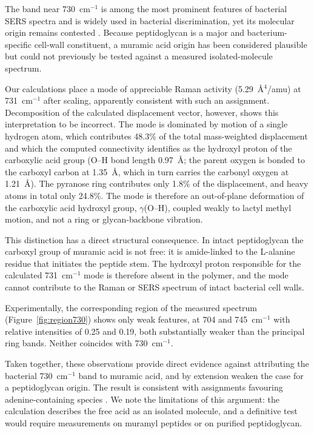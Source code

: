 \documentclass[preprint,12pt]{elsarticle}
\newcommand{\wn}{\ensuremath{\mathrm{cm}^{-1}}}
\begin{document}
The band near 730~\wn{} is among the most prominent features of bacterial
SERS spectra and is widely used in bacterial discrimination, yet its
molecular origin remains contested
\cite{premasiri2016origins,kubryk2016origin}. Because peptidoglycan is a
major and bacterium-specific cell-wall constituent, a muramic acid origin has
been considered plausible but could not previously be tested against a
measured isolated-molecule spectrum.

Our calculations place a mode of appreciable Raman activity
(5.29~\AA$^4$/amu) at 731~\wn{} after scaling, apparently consistent with
such an assignment. Decomposition of the calculated displacement vector,
however, shows this interpretation to be incorrect. The mode is dominated by
motion of a single hydrogen atom, which contributes 48.3\% of the total
mass-weighted displacement and which the computed connectivity identifies as
the hydroxyl proton of the carboxylic acid group (O--H bond length 0.97~\AA;
the parent oxygen is bonded to the carboxyl carbon at 1.35~\AA, which in turn
carries the carbonyl oxygen at 1.21~\AA). The pyranose ring contributes only
1.8\% of the displacement, and heavy atoms in total only 24.8\%. The mode is
therefore an out-of-plane deformation of the carboxylic acid hydroxyl group,
$\gamma$(O--H), coupled weakly to lactyl methyl motion, and not a ring or
glycan-backbone vibration.

This distinction has a direct structural consequence. In intact
peptidoglycan the carboxyl group of muramic acid is not free: it is
amide-linked to the L-alanine residue that initiates the peptide stem. The
hydroxyl proton responsible for the calculated 731~\wn{} mode is therefore
absent in the polymer, and the mode cannot contribute to the Raman or SERS
spectrum of intact bacterial cell walls.

Experimentally, the corresponding region of the measured spectrum
(Figure~\ref{fig:region730}) shows only weak features, at 704 and 745~\wn{}
with relative intensities of 0.25 and 0.19, both substantially weaker than
the principal ring bands. Neither coincides with 730~\wn{}.

Taken together, these observations provide direct evidence against
attributing the bacterial 730~\wn{} band to muramic acid, and by extension
weaken the case for a peptidoglycan origin. The result is consistent with
assignments favouring adenine-containing species
\cite{premasiri2016origins,kubryk2016origin}. We note the limitations of this
argument: the calculation describes the free acid as an isolated molecule,
and a definitive test would require measurements on muramyl peptides or on
purified peptidoglycan.
\end{document}
